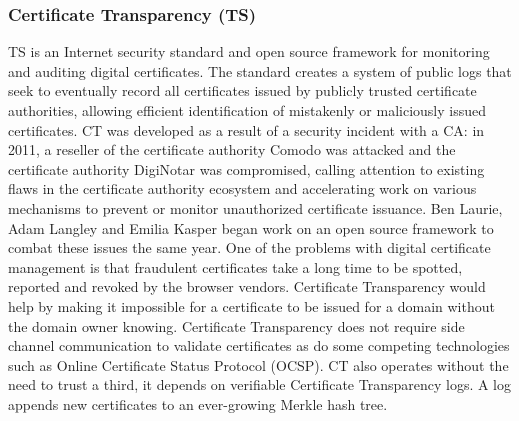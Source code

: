 \documentclass[a4paper, 10pt, titlepage]{article}
\begin{document}
\subsubsection{Certificate Transparency (TS)}
TS is an Internet security standard and open source framework for monitoring and auditing digital certificates. The standard creates a system of public logs that seek to eventually record all certificates issued by publicly trusted certificate authorities, allowing efficient identification of mistakenly or maliciously issued certificates.
CT was developed as a result of a security incident with a CA: in 2011, a reseller of the certificate authority Comodo was attacked and the certificate authority DigiNotar was compromised, calling attention to existing flaws in the certificate authority ecosystem and accelerating work on various mechanisms to prevent or monitor unauthorized certificate issuance. Ben Laurie, Adam Langley and Emilia Kasper began work on an open source framework to combat these issues the same year. 
One of the problems with digital certificate management is that fraudulent certificates take a long time to be spotted, reported and revoked by the browser vendors. Certificate Transparency would help by making it impossible for a certificate to be issued for a domain without the domain owner knowing. Certificate Transparency does not require side channel communication to validate certificates as do some competing technologies such as Online Certificate Status Protocol (OCSP). CT also operates without the need to trust a third, it depends on verifiable Certificate Transparency logs. A log appends new certificates to an ever-growing Merkle hash tree.
\end{document}

